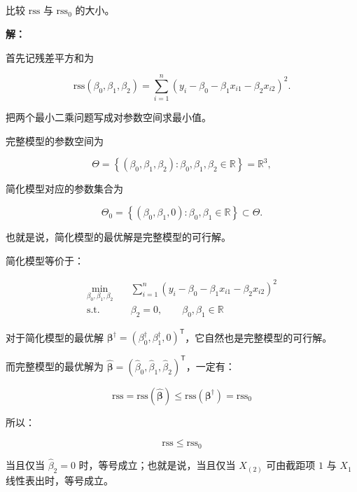 \documentclass[12pt,a4paper]{article}
\begin{document}
\subsection{}

比较 $\mathrm{rss}$ 与 $\mathrm{rss}_0$ 的大小。

\begin{answerbox}
\textbf{解：}

首先记残差平方和为

$$
\mathrm{rss}(\beta_0, \beta_1, \beta_2) = \sum_{i=1}^{n}
  (y_i-\beta_0-\beta_1x_{i1}-\beta_2x_{i2})^2.
$$

把两个最小二乘问题写成对参数空间求最小值。

完整模型的参数空间为

$$
\Theta =\left\{(\beta_0, \beta_1, \beta_2): \beta_0, \beta_1, \beta_2 \in \mathbb{R} \right\} = \mathbb{R}^3,
$$

简化模型对应的参数集合为

$$
\Theta_0 =\left\{(\beta_0, \beta_1, 0): \beta_0, \beta_1 \in \mathbb{R} \right\} \subset \Theta.
$$

也就是说，简化模型的最优解是完整模型的可行解。

简化模型等价于：

$$
\begin{aligned}
\min_{\beta_0, \beta_1, \beta_2}\quad & \sum_{i=1}^{n}
  (y_i-\beta_0-\beta_1x_{i1}-\beta_2x_{i2})^2 \\
\text{s.t.}\quad & \beta_2 = 0,\qquad \beta_0, \beta_1 \in \mathbb{R}
\end{aligned}
$$

对于简化模型的最优解 $\boldsymbol{\beta}^{\dagger} = (\beta_0^{\dagger}, \beta_1^{\dagger}, 0)^{\mathsf{T}}$，它自然也是完整模型的可行解。

而完整模型的最优解为 $\hat{\boldsymbol{\beta}} = (\hat{\beta}_0, \hat{\beta}_1, \hat{\beta}_2)^{\mathsf{T}}$，一定有：

$$
\mathrm{rss} = \mathrm{rss}(\hat{\boldsymbol{\beta}}) \leq \mathrm{rss}(\boldsymbol{\beta}^{\dagger}) = \mathrm{rss}_0
$$

所以：

$$
\mathrm{rss} \leq \mathrm{rss}_0
$$

当且仅当 $\hat{\beta}_2=0$ 时，等号成立；也就是说，当且仅当 $X_{(2)}$ 可由截距项 $1$ 与 $X_{1}$ 线性表出时，等号成立。

\end{answerbox}

\subsection{}
\end{document}
